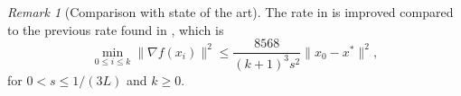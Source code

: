 \documentclass{article}
\theoremstyle{plain}
\theoremstyle{definition}
\theoremstyle{remark}
\newtheorem{remark}{Remark}[theorem]
\begin{document}
\begin{remark}[Comparison with state of the art]
    The rate in  is improved compared to the previous rate found in \citep{Shi2021UnderstandingTA}, which is 
$$ \min_{0\leq i\leq k}\|\nabla f(x_i)\|^2 \leq \frac{8568}{(k+1)^3s^2}\|x_0-x^*\|^2,$$
for $0< s\leq 1/(3L)$ and $k\geq0$.
\end{remark}
\end{document}
